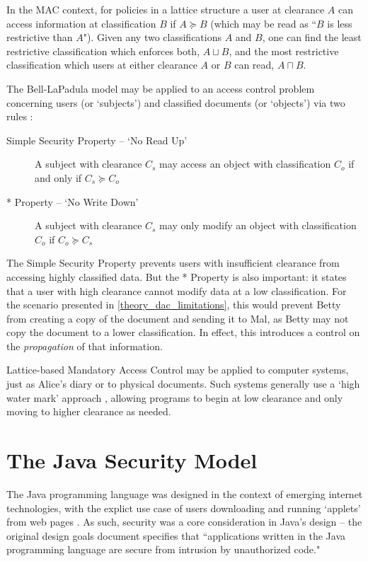 In the MAC context, for policies in a lattice structure a user at clearance $ A $ can access information at classification $ B $ if $ A \succeq B $ (which may be read as ``$ B $ is less restrictive than $ A $"). Given any two classifications $ A $ and $ B $, one can find the least restrictive classification which enforces both, $ A \sqcup B $, and the most restrictive classification which users at either clearance $ A $ or $ B $ can read, $ A \sqcap B $.

The Bell-LaPadula model may be applied to an access control problem concerning users (or `subjects') and classified documents (or `objects') via two rules \cite{sandhu1993lattice}:

\begin{description}
	\item[Simple Security Property -- `No Read Up'] A subject with clearance $ C_s $ may access an object with classification $ C_o $ if and only if $ C_s \succeq C_o $
	
	\item[* Property -- `No Write Down'] A subject with clearance $ C_s $ may only modify an object with classification $ C_o $ if $ C_o \succeq C_s $
\end{description}

The Simple Security Property prevents users with insufficient clearance from accessing highly classified data. But the * Property is also important: it states that a user with high clearance cannot modify data at a low classification. For the scenario presented in \ref{theory_dac_limitations}, this would prevent Betty from creating a copy of the document and sending it to Mal, as Betty may not copy the document to a lower classification. In effect, this introduces a control on the \textit{propagation} of that information.

Lattice-based Mandatory Access Control may be applied to computer systems, just as Alice's diary or to physical documents. Such systems generally use a `high water mark' approach \cite{jones1975highwatermark}, allowing programs to begin at low clearance and only moving to higher clearance as needed.

\section{The Java Security Model}

The Java programming language was designed in the context of emerging internet technologies, with the explict use case of users downloading and running `applets' from web pages \cite{gong1999javasecspec}. As such, security was a core consideration in Java's design -- the original design goals document \cite{javadesignprinciples} specifies that ``applications written in the Java programming language are secure from intrusion by unauthorized code."
 
